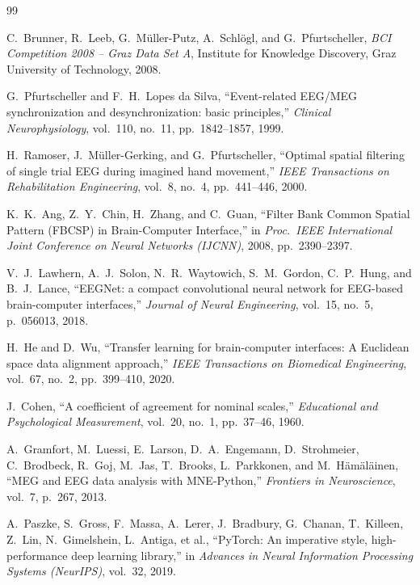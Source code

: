 \documentclass[11pt,a4paper]{article}
\begin{document}
\newpage
\begin{thebibliography}{99}

C.~Brunner, R.~Leeb, G.~M{\"u}ller-Putz, A.~Schl{\"o}gl, and G.~Pfurtscheller,
\emph{BCI Competition 2008 -- Graz Data Set A}, Institute for Knowledge Discovery, Graz University of
Technology, 2008.

G.~Pfurtscheller and F.~H.\ Lopes da Silva,
``Event-related EEG/MEG synchronization and desynchronization: basic principles,''
\emph{Clinical Neurophysiology}, vol.\ 110, no.\ 11, pp.\ 1842--1857, 1999.

H.~Ramoser, J.~M{\"u}ller-Gerking, and G.~Pfurtscheller,
``Optimal spatial filtering of single trial EEG during imagined hand movement,''
\emph{IEEE Transactions on Rehabilitation Engineering}, vol.\ 8, no.\ 4, pp.\ 441--446, 2000.

K.~K.\ Ang, Z.~Y.\ Chin, H.~Zhang, and C.~Guan,
``Filter Bank Common Spatial Pattern (FBCSP) in Brain-Computer Interface,''
in \emph{Proc.\ IEEE International Joint Conference on Neural Networks (IJCNN)}, 2008, pp.\
2390--2397.

V.~J.\ Lawhern, A.~J.\ Solon, N.~R.\ Waytowich, S.~M.\ Gordon, C.~P.\ Hung, and B.~J.\ Lance,
``EEGNet: a compact convolutional neural network for EEG-based brain-computer interfaces,''
\emph{Journal of Neural Engineering}, vol.\ 15, no.\ 5, p.\ 056013, 2018.

H.~He and D.~Wu,
``Transfer learning for brain-computer interfaces: A Euclidean space data alignment approach,''
\emph{IEEE Transactions on Biomedical Engineering}, vol.\ 67, no.\ 2, pp.\ 399--410, 2020.

J.~Cohen,
``A coefficient of agreement for nominal scales,''
\emph{Educational and Psychological Measurement}, vol.\ 20, no.\ 1, pp.\ 37--46, 1960.

A.~Gramfort, M.~Luessi, E.~Larson, D.~A.\ Engemann, D.~Strohmeier, C.~Brodbeck, R.~Goj, M.~Jas,
T.~Brooks, L.~Parkkonen, and M.~H{\"a}m{\"a}l{\"a}inen,
``MEG and EEG data analysis with MNE-Python,''
\emph{Frontiers in Neuroscience}, vol.\ 7, p.\ 267, 2013.

A.~Paszke, S.~Gross, F.~Massa, A.~Lerer, J.~Bradbury, G.~Chanan, T.~Killeen, Z.~Lin, N.~Gimelshein,
L.~Antiga, et al.,
``PyTorch: An imperative style, high-performance deep learning library,''
in \emph{Advances in Neural Information Processing Systems (NeurIPS)}, vol.\ 32, 2019.

\end{thebibliography}
\end{document}
